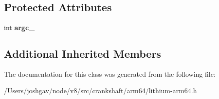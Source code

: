 \subsection*{Protected Attributes}
\begin{DoxyCompactItemize}
\item 
int {\bfseries argc\+\_\+}\hypertarget{classv8_1_1internal_1_1_l_prepare_push_arguments_a3e9dde2b6fb6cbd64f02db2154bd3fe8}{}\label{classv8_1_1internal_1_1_l_prepare_push_arguments_a3e9dde2b6fb6cbd64f02db2154bd3fe8}

\end{DoxyCompactItemize}
\subsection*{Additional Inherited Members}


The documentation for this class was generated from the following file\+:\begin{DoxyCompactItemize}
\item 
/\+Users/joshgav/node/v8/src/crankshaft/arm64/lithium-\/arm64.\+h\end{DoxyCompactItemize}
